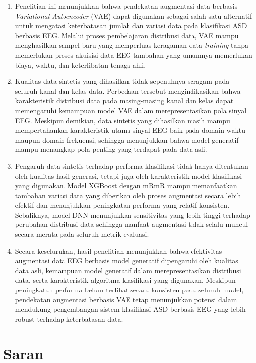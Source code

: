 \begin{enumerate}
    \item Penelitian ini menunjukkan bahwa pendekatan augmentasi data berbasis \textit{Variational Autoencoder} (VAE) dapat digunakan sebagai salah satu alternatif untuk mengatasi keterbatasan jumlah dan variasi data pada klasifikasi ASD berbasis EEG. Melalui proses pembelajaran distribusi data, VAE mampu menghasilkan sampel baru yang memperluas keragaman data \textit{training} tanpa memerlukan proses akuisisi data EEG tambahan yang umumnya memerlukan biaya, waktu, dan keterlibatan tenaga ahli.

    \item Kualitas data sintetis yang dihasilkan tidak sepenuhnya seragam pada seluruh kanal dan kelas data. Perbedaan tersebut mengindikasikan bahwa karakteristik distribusi data pada masing-masing kanal dan kelas dapat memengaruhi kemampuan model VAE dalam merepresentasikan pola sinyal EEG. Meskipun demikian, data sintetis yang dihasilkan masih mampu mempertahankan karakteristik utama sinyal EEG baik pada domain waktu maupun domain frekuensi, sehingga menunjukkan bahwa model generatif mampu menangkap pola penting yang terdapat pada data asli.

    \item Pengaruh data sintetis terhadap performa klasifikasi tidak hanya ditentukan oleh kualitas hasil generasi, tetapi juga oleh karakteristik model klasifikasi yang digunakan. Model XGBoost dengan mRmR mampu memanfaatkan tambahan variasi data yang diberikan oleh proses augmentasi secara lebih efektif dan menunjukkan peningkatan performa yang relatif konsisten. Sebaliknya, model DNN menunjukkan sensitivitas yang lebih tinggi terhadap perubahan distribusi data sehingga manfaat augmentasi tidak selalu muncul secara merata pada seluruh metrik evaluasi.

\item Secara keseluruhan, hasil penelitian menunjukkan bahwa efektivitas augmentasi data EEG berbasis model generatif dipengaruhi oleh kualitas data asli, kemampuan model generatif dalam merepresentasikan distribusi data, serta karakteristik algoritma klasifikasi yang digunakan. Meskipun peningkatan performa belum terlihat secara konsisten pada seluruh model, pendekatan augmentasi berbasis VAE tetap menunjukkan potensi dalam mendukung pengembangan sistem klasifikasi ASD berbasis EEG yang lebih robust terhadap keterbatasan data.
\end{enumerate}

\section{Saran}

